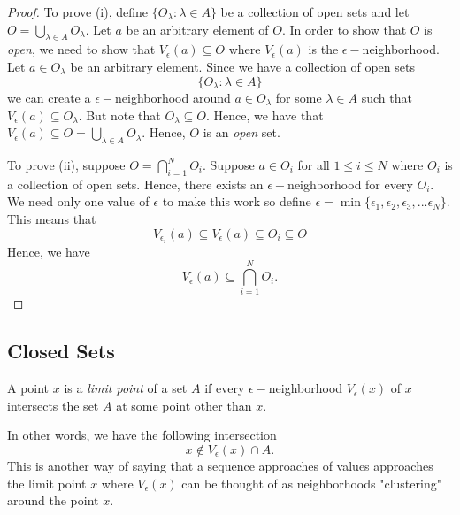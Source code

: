\begin{proof}
    To prove (i), define \( \{ O_{\lambda} : \lambda \in A \}  \) be a collection of open sets and let \( O = \bigcup_{ \lambda \in A  } O_{\lambda} \). Let \( a  \) be an arbitrary element of \( O \). In order to show that \( O \) is \textit{open}, we need to show that \( V_{\epsilon }(a) \subseteq O \) where \( V_{\epsilon }(a) \) is the \( \epsilon - \)neighborhood. Let \(  a \in O_{\lambda} \) be an arbitrary element. Since we have a collection of open sets 
    \[ \{ O_{\lambda}  : \lambda \in A \}  \]
    we can create a \( \epsilon - \)neighborhood around \( a \in O_{\lambda}  \) for some \( \lambda \in A  \) such that \( V_{\epsilon }(a) \subseteq O_{\lambda}\). But note that \( O_{\lambda} \subseteq O \). Hence, we have that \( V_{\epsilon } (a) \subseteq O = \bigcup_{ \lambda \in A  } O_{\lambda}\). Hence, \( O \) is an \textit{open} set.
    
    To prove (ii), suppose \( O = \bigcap_{ i =1  }^{ N } O_{i}  \). Suppose \( a \in O_{i} \) for all \( 1 \leq  i \leq N \) where \( O_{i} \) is a collection of open sets. Hence, there exists an \( \epsilon- \)neighborhood for every \( O_i  \). We need only one value of \( \epsilon  \) to make this work so define \( \epsilon = \min \{ \epsilon_1, \epsilon_2, \epsilon_3, ... \epsilon_N \}  \).  This means that \[ V_{\epsilon_i} (a) \subseteq V_{\epsilon}(a) \subseteq O_{i} \subseteq O  \] 
Hence, we have 
\[ V_{\epsilon}(a) \subseteq \bigcap_{ i=1 }^{ N } O_i. \] 
\end{proof}

\subsection{Closed Sets} 

\begin{tcolorbox}
\begin{defn}
    A point \( x \) is a \textit{limit point} of a set \( A  \) if every \( \epsilon- \)neighborhood \( V_{\epsilon }(x) \) of \( x \) intersects the set \( A  \) at some point other than \( x \). 
\end{defn}
\end{tcolorbox}
In other words, we have the following intersection 
\[ x \notin V_{\epsilon }(x) \cap A.  \]
This is another way of saying that a sequence approaches of values approaches the limit point \( x \) where \( V_{\epsilon }(x) \) can be thought of as neighborhoods "clustering" around the point \( x \). 


